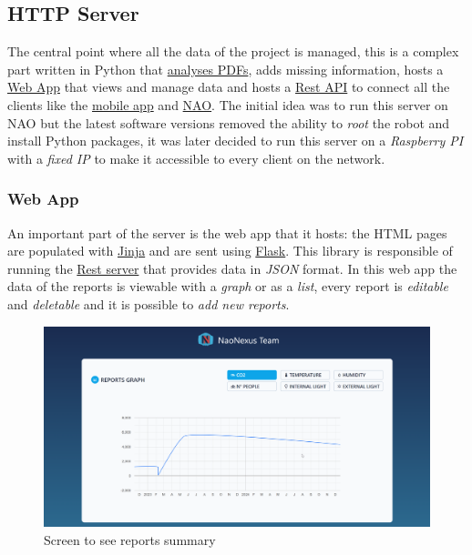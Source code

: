 \documentclass{optica-article}
\begin{document}
\vspace{12pt}
\subsection{HTTP Server}\label{sec:domotics_server}
The central point where all the data of the project is managed, this is a complex part written in Python that \hyperref[sec:domotics_pdf_analysis]{analyses PDFs}, adds missing information, hosts a \hyperref[sec:domotics_web_app]{Web App} that views and manage data and hosts a \hyperref[sec:domotics_rest_api]{Rest API} to connect all the clients like the \hyperref[sec:domotics_app]{mobile app} and \hyperref[sec:domotics_nao]{NAO}. The initial idea was to run this server on NAO but the latest software versions removed the ability to \emph{root} the robot and install Python packages, it was later decided to run this server on a \emph{Raspberry PI} with a \emph{fixed IP} to make it accessible to every client on the network.

\subsubsection{Web App}\label{sec:domotics_web_app}
An important part of the server is the web app that it hosts: the HTML pages are populated with \href{https://jinja.palletsprojects.com/en/3.1.x/}{Jinja} and are sent using \href{https://flask.palletsprojects.com/en/2.2.x/}{Flask}. This library is responsible of running the \hyperref[sec:domotics_rest_api]{Rest server} that provides data in \emph{JSON} format. In this web app the data of the reports is viewable with a \emph{graph} or as a \emph{list}, every report is \emph{editable} and \emph{deletable} and it is possible to \emph{add new reports}. 

\begin{figure}[H]
    \centering
    \includegraphics[scale=0.26]{figures/web_app_summary.png}
    \caption{Screen to see reports summary}
    \label{fig:webb_app_summary}
\end{figure}
\end{document}
